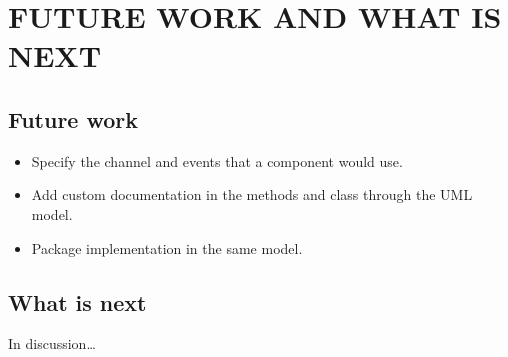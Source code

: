 \section{FUTURE WORK AND WHAT IS NEXT}

\subsection {Future work}
\begin{itemize}
  \item Specify the channel and events that a component would use.
  \item Add custom documentation in the methods and class through the UML model.
  \item Package implementation in the same model.
\end{itemize} 

\subsection {What is next}
In discussion\ldots